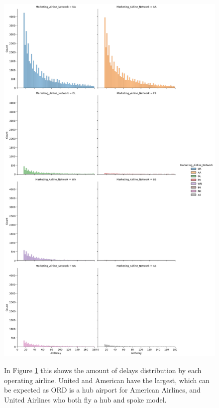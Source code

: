 \documentclass[a4paper,12pt]{article}
\begin{document}
\begin{figure}
    \centering
    \includegraphics*[scale=.35]{../../img/delays_by_airline.png}
    \caption[]{}
    \label{fig:delaybyairline}
    In Figure \ref{fig:delaybyairline} this shows the amount of delays distribution by each operating airline. United and American have the largest,
    which can be expected as ORD is a hub airport for American Airlines, and United Airlines who both fly a hub and spoke model. 
\end{figure}
\end{document}
